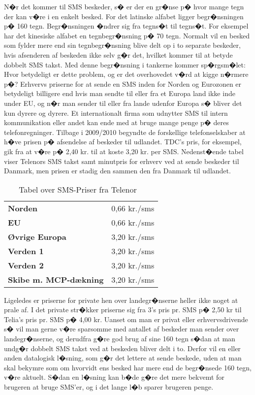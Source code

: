 N�r det kommer til SMS beskeder, s� er der en gr�nse p� hvor mange tegn der kan v�re i en enkelt besked. For det latinske alfabet ligger begr�nsningen p� 160 tegn. Begr�nsningen �ndrer sig fra tegns�t til tegns�t. For eksempel har det kinesiske alfabet en tegnbegr�nsning p� 70 tegn\cite{Pro_1}. Normalt vil en besked som fylder mere end sin tegnbegr�nsning blive delt op i to separate beskeder, hvis afsenderen af beskeden ikke selv g�r det, hvilket kommer til at betyde dobbelt SMS takst. Med denne begr�nsning i tankerne kommer sp�rgsm�let: Hvor betydeligt er dette problem, og er det overhovedet v�rd at kigge n�rmere p�?
Erhvervs priserne for at sende en SMS inden for Norden og Eurozonen er betydeligt billigere end hvis man sendte til eller fra et Europa land ikke inde under EU, og n�r man sender til eller fra lande udenfor Europa s� bliver det kun dyrere og dyrere. Et internationalt firma som udnytter SMS til intern kommunikation eller andet kan ende med at bruge mange penge p� deres telefonregninger. Tilbage i 2009/2010 begyndte de forskellige telefonselskaber at h�ve prisen p� afsendelse af beskeder til udlandet. TDC's pris, for eksempel, gik fra at v�re p� 2,40 kr. til at koste 3,20 kr. per SMS\cite{Pro_2}. Nedenst�ende tabel viser Telenors SMS takst samt minutpris for erhverv ved at sende beskeder til Danmark, men prisen er stadig den sammen den fra Danmark til udlandet\cite{Pro_3}.

\begin{table}
\begin{center}
 \begin{tabular}{ | l | r |}
    \hline
    \cellcolor{ForestGreen} &  \cellcolor{ForestGreen}\color{white}{\textbf{Sende/Modtage SMS}}\\[2ex] \hline
    \textbf{Norden} & 0,66 kr./sms \\ \hline
    \textbf{EU} & 0,66 kr./sms \\ \hline
    \textbf{Øvrige Europa} & 3,20 kr./sms \\ \hline
    \textbf{Verden 1} & 3,20 kr./sms \\ \hline
    \textbf{Verden 2} & 3,20 kr./sms \\ \hline
    \textbf{Skibe m. MCP-dækning} & 3,20 kr./sms \\ \hline
\end{tabular} 
\caption{Tabel over SMS-Priser fra Telenor ~\cite{Pro_3}}
\end{center}
\end{table}

Ligeledes er priserne for private hen over landegr�nserne heller ikke noget at prale af. I det private str�kker priserne sig fra 3's pris pr. SMS p� 2,50 kr\cite{Pro_4} til Telia's pris pr. SMS p� 4,00 kr\cite{Pro_5}. Uanset om man er privat eller erhvervsdrivende s� vil man gerne v�re sparsomme med antallet af beskeder man sender over landegr�nserne, og derudfra g�re god brug af sine 160 tegn s�dan at man undg�r dobbelt SMS takst ved at beskeden bliver delt i to.
Derfor vil en eller anden datalogisk l�sning, som g�r det lettere at sende beskede, uden at man skal bekymre som om hvorvidt ens besked har mere end de begr�nsede 160 tegn, v�re aktuelt. S�dan en l�sning kan b�de g�re det mere bekvemt for brugeren at bruge SMS'er, og i det lange l�b sparer brugeren penge.